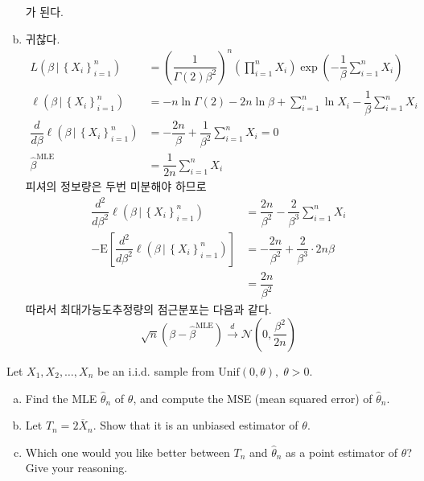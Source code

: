 \documentclass[answers]{exam}
\begin{document}
\begin{questions}
\begin{solution}
\begin{enumerate}[(a)]
      가 된다.
      \item 귀찮다.
      \begin{align}
        L\left(\beta\,|\,\left\{X_{i}\right\}_{i=1}^{n}\right) &= \left(\dfrac{1}{\Gamma\left(2\right)\beta^{2}}\right)^{n}\left(\prod_{i=1}^{n}X_{i}\right)\exp\left(-\dfrac{1}{\beta}\sum_{i=1}^{n}X_{i}\right)\\
        \ell\left(\beta\,|\,\left\{X_{i}\right\}_{i=1}^{n}\right) &= -n\ln\Gamma\left(2\right)-2n\ln \beta +\sum_{i=1}^{n}\ln X_{i} -\dfrac{1}{\beta}\sum_{i=1}^{n}X_{i}\\
        \dfrac{d}{d\beta}\ell\left(\beta\,|\,\left\{X_{i}\right\}_{i=1}^{n}\right) &= -\dfrac{2n}{\beta}+\dfrac{1}{\beta^{2}}\sum_{i=1}^{n}X_{i}=0\\
        \widehat{\beta}^{\text{MLE}} &= \dfrac{1}{2n}\sum_{i=1}^{n}X_{i}
      \end{align}
      피셔의 정보량은 두번 미분해야 하므로
      \begin{align}
        \dfrac{d^{2}}{d\beta^{2}}\ell\left(\beta\,|\,\left\{X_{i}\right\}_{i=1}^{n}\right) &= \dfrac{2n}{\beta^{2}}-\dfrac{2}{\beta^{3}}\sum_{i=1}^{n}X_{i}\\
        -\mathrm{E}\left[\dfrac{d^{2}}{d\beta^{2}}\ell\left(\beta\,|\,\left\{X_{i}\right\}_{i=1}^{n}\right) \right] &= -\dfrac{2n}{\beta^{2}}+\dfrac{2}{\beta^{3}}\cdot 2n\beta\\
        &= \dfrac{2n}{\beta^{2}}
      \end{align}
      따라서 최대가능도추정량의 점근분포는 다음과 같다.
      \begin{equation}
        \sqrt{n}\left(\beta-\widehat{\beta}^{\text{MLE}}\right) \xrightarrow{d}\mathcal{N}\left(0,\dfrac{\beta^{2}}{2n}\right)
      \end{equation}
    \end{enumerate}
   \end{solution}
   \question
   Let $X_{1},X_{2},\ldots,X_{n}$ be an i.i.d. sample from $\mathrm{Unif}\left(0,\theta\right), \; \theta>0$.
   \begin{enumerate}[(a)]
    \item Find the MLE $\widehat{\theta}_{n}$ of $\theta$, and compute the MSE (mean squared error) of $\widehat{\theta}_{n}$.
    \item Let $T_{n}=2\overline{X}_{n}$. Show that it is an unbiased estimator of $\theta$.
    \item Which one would you like better between $T_{n}$ and $\widehat{\theta}_{n}$ as a point estimator of $\theta$? Give your reasoning.

\end{enumerate}
\end{questions}
\end{document}
